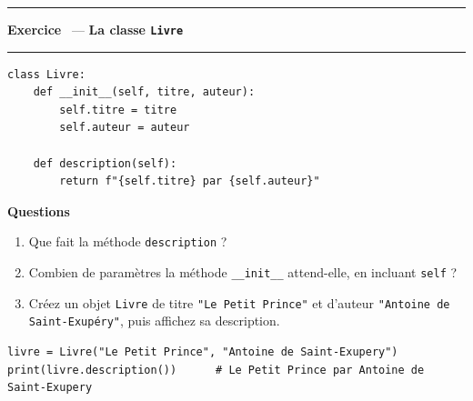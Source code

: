 \documentclass[10pt,a4paper]{article}
\newif\ifcorrige
\newcommand{\py}[1]{\texttt{#1}}
\newcounter{exo}
\newcommand{\exo}[1]{%
  \stepcounter{exo}\par\vspace{4pt}
  \ifcorrige\else\noindent\minipage{\textwidth}\fi
  \noindent\textcolor{qbar}{\rule{2.5pt}{10pt}}\hspace{4pt}%
  \textbf{\color{qbar}Exercice \theexo}\ --- \textbf{#1}%
  \par\nobreak\vspace{-3pt}\noindent\textcolor{qbar!35}{\rule{\textwidth}{0.6pt}}%
  \par\nobreak\vspace{1pt}}
\newenvironment{codebloc}
  {\ifcorrige\else\noindent\minipage[t]{0.50\textwidth}\vspace{0pt}\fi}
  {\ifcorrige\else\endminipage\hfill\fi}
\newenvironment{qbloc}
  {\ifcorrige\else\minipage[t]{0.475\textwidth}\vspace{0pt}\fi
   \textbf{\small Questions}\begin{enumerate}[leftmargin=*,nosep,label=\arabic*.]}
  {\end{enumerate}\ifcorrige\else\endminipage\par\fi}
\newcommand{\rep}[1]{\ifcorrige\par\smallskip{\color{corr}\small#1}\par\smallskip\fi}
\newlength{\zoneadj}\setlength{\zoneadj}{0pt}
\newcommand{\zone}[1][4cm]{%
  \ifcorrige\else
    \par\vspace{2pt}\noindent
    \begin{tcolorbox}[colback=white,colframe=black!45,boxrule=0.5pt,arc=1pt,height={\dimexpr#1-\zoneadj\relax},
      left=4pt,right=4pt,top=2pt,bottom=2pt,
      title={\scriptsize\itshape Réponses},coltitle=black!55,fonttitle=\itshape,
      detach title,before upper={\tcbtitle\par}]\end{tcolorbox}%
    \endminipage\par
  \fi}
\newenvironment{solution}
  {\ifcorrige
     \begin{tcolorbox}[enhanced,breakable,colback=corrbg,colframe=corr,boxrule=0.6pt,arc=1pt,
       left=5pt,right=5pt,top=3pt,bottom=3pt,fontupper=\small,
       title={Corrigé},coltitle=corr,fonttitle=\bfseries\small,detach title,
       before upper={\tcbtitle\par\smallskip}]%
   \else
     \setbox0\vbox\bgroup
   \fi}
  {\ifcorrige\end{tcolorbox}\else\egroup\fi}
\begin{document}
\exo{La classe \py{Livre}}
\begin{codebloc}
\begin{lstlisting}
class Livre:
    def __init__(self, titre, auteur):
        self.titre = titre
        self.auteur = auteur

    def description(self):
        return f"{self.titre} par {self.auteur}"
\end{lstlisting}
\end{codebloc}
\begin{qbloc}
  \item Que fait la méthode \py{description} ?
    \rep{Elle retourne une chaîne qui associe le titre et l'auteur du livre, sous la forme
    \py{"titre par auteur"}.}
  \item Combien de paramètres la méthode \py{__init__} attend-elle, en incluant \py{self} ?
    \rep{Trois : \py{self}, \py{titre} et \py{auteur}. À l'appel, seuls deux arguments sont
    fournis : \py{self} est transmis automatiquement par Python.}
  \item Créez un objet \py{Livre} de titre \py{"Le Petit Prince"} et d'auteur
    \py{"Antoine de Saint-Exupéry"}, puis affichez sa description.
\end{qbloc}
\zone[3.8cm]
\begin{solution}
\begin{lstlisting}
livre = Livre("Le Petit Prince", "Antoine de Saint-Exupery")
print(livre.description())      # Le Petit Prince par Antoine de Saint-Exupery
\end{lstlisting}
\end{solution}
\end{document}
